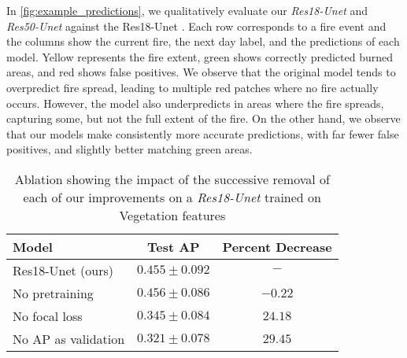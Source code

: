 In \cref{fig:example_predictions}, we qualitatively evaluate our \textit{Res18-Unet} and \textit{Res50-Unet} against the Res18-Unet \cite{gerard2023wildfirespreadts}. Each row corresponds to a fire event and the columns show the current fire, the next day label, and the predictions of each model. Yellow represents the fire extent, green shows correctly predicted burned areas, and red shows false positives. 
We observe that the original model tends to overpredict fire spread, leading to multiple red patches where no fire actually occurs. However, the model also underpredicts in areas where the fire spreads, capturing some, but not the full extent of the fire. On the other hand, we observe that our models make consistently more accurate predictions, with far fewer false positives, and slightly better matching green areas.

\begin{table}[]
\caption{Ablation showing the impact of the successive removal of each of our improvements on a \textit{Res18-Unet} trained on Vegetation features}
    \centering
    \begin{tabular}{lcc}
        \toprule
        \textbf{Model} & \textbf{Test AP} & \textbf{Percent Decrease} \\
        \midrule
        Res18-Unet (ours) & $0.455 \pm 0.092$ & $-$ \\
        No pretraining & $0.456 \pm 0.086$ & $-0.22$ \\
        No focal loss & $0.345 \pm 0.084$ & $24.18$ \\
        No AP as validation & $0.321 \pm 0.078$ & $29.45$ \\
        \bottomrule
    \end{tabular}
    
    \label{tab:ablation_t1}
\end{table}

